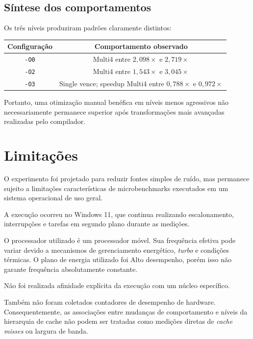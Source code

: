 \subsection{Síntese dos comportamentos}

Os três níveis produziram padrões claramente distintos:

\begin{center}
\begin{tabular}{c|c}
\hline
Configuração & Comportamento observado \\
\hline
\texttt{-O0} & Multi4 entre \(2{,}098\times\) e \(2{,}719\times\) \\
\texttt{-O2} & Multi4 entre \(1{,}543\times\) e \(3{,}045\times\) \\
\texttt{-O3} & Single vence; speedup Multi4 entre \(0{,}788\times\) e \(0{,}972\times\) \\
\hline
\end{tabular}
\end{center}

Portanto, uma otimização manual benéfica em níveis menos agressivos não necessariamente
permanece superior após transformações mais avançadas realizadas pelo compilador.


\section{Limitações}

\label{sec:atvd02-limitacoes}

O experimento foi projetado para reduzir fontes simples de ruído, mas permanece sujeito a
limitações características de microbenchmarks executados em um sistema operacional de uso
geral.

A execução ocorreu no Windows 11, que continua realizando escalonamento, interrupções e
tarefas em segundo plano durante as medições.

O processador utilizado é um processador móvel. Sua frequência efetiva pode variar devido a
mecanismos de gerenciamento energético, \textit{turbo} e condições térmicas. O plano de
energia utilizado foi Alto desempenho, porém isso não garante frequência absolutamente
constante.

Não foi realizada afinidade explícita da execução com um núcleo específico.

Também não foram coletados contadores de desempenho de hardware. Consequentemente, as
associações entre mudanças de comportamento e níveis da hierarquia de cache não podem ser
tratadas como medições diretas de \textit{cache misses} ou largura de banda.

